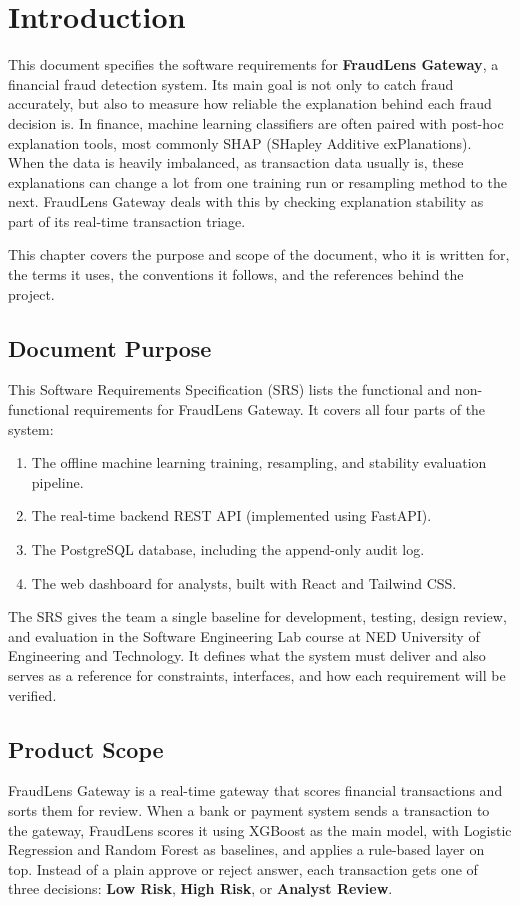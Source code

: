 \documentclass[12pt, a4paper]{report}
\begin{document}
\chapter{Introduction}

This document specifies the software requirements for \textbf{FraudLens Gateway}, a financial fraud detection system. Its main goal is not only to catch fraud accurately, but also to measure how reliable the explanation behind each fraud decision is. In finance, machine learning classifiers are often paired with post-hoc explanation tools, most commonly SHAP (SHapley Additive exPlanations). When the data is heavily imbalanced, as transaction data usually is, these explanations can change a lot from one training run or resampling method to the next. FraudLens Gateway deals with this by checking explanation stability as part of its real-time transaction triage.

This chapter covers the purpose and scope of the document, who it is written for, the terms it uses, the conventions it follows, and the references behind the project.

\section{Document Purpose}
This Software Requirements Specification (SRS) lists the functional and non-functional requirements for FraudLens Gateway. It covers all four parts of the system:
\begin{enumerate}
    \item The offline machine learning training, resampling, and stability evaluation pipeline.
    \item The real-time backend REST API (implemented using FastAPI).
    \item The PostgreSQL database, including the append-only audit log.
    \item The web dashboard for analysts, built with React and Tailwind CSS.
\end{enumerate}

The SRS gives the team a single baseline for development, testing, design review, and evaluation in the Software Engineering Lab course at NED University of Engineering and Technology. It defines what the system must deliver and also serves as a reference for constraints, interfaces, and how each requirement will be verified.

\section{Product Scope}
FraudLens Gateway is a real-time gateway that scores financial transactions and sorts them for review. When a bank or payment system sends a transaction to the gateway, FraudLens scores it using XGBoost as the main model, with Logistic Regression and Random Forest as baselines, and applies a rule-based layer on top. Instead of a plain approve or reject answer, each transaction gets one of three decisions: \textbf{Low Risk}, \textbf{High Risk}, or \textbf{Analyst Review}.
\end{document}
